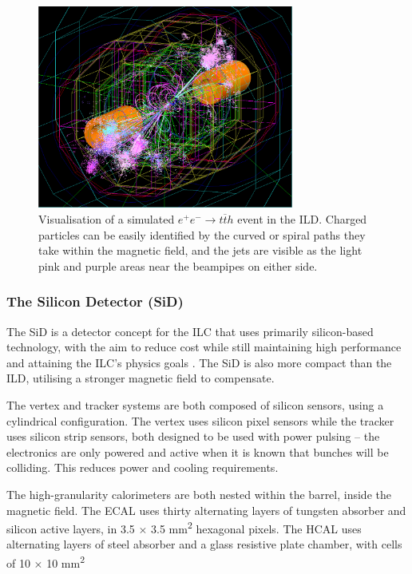 \begin{figure}[h]
	\centering
	\includegraphics[width=0.75\textwidth]{../Pictures/SimulatedEvent1.png}
	\caption{Visualisation of a simulated $e^+ e^- \rightarrow t \overline{t} h$ event in the \acrshort{ILD}. Charged particles can be easily identified by the curved or spiral paths they take within the magnetic field, and the jets are visible as the light pink and purple areas near the beampipes on either side.}
	\label{figure:colliders/ILD/tth-simulation}
\end{figure}

\subsubsection{The Silicon Detector (SiD)}
The \acrfull{SiD} is a detector concept for the \acrshort{ILC} that uses primarily silicon-based technology, with the aim to reduce cost while still maintaining high performance and attaining the \acrshort{ILC}'s physics goals \cite{ilc-tdr-detectors}. The \acrshort{SiD} is also more compact than the \acrshort{ILD}, utilising a stronger magnetic field to compensate.

The vertex and tracker systems are both composed of silicon sensors, using a cylindrical configuration. The vertex uses silicon pixel sensors while the tracker uses silicon strip sensors, both designed to be used with power pulsing -- the electronics are only powered and active when it is known that bunches will be colliding. This reduces power and cooling requirements. 

The high-granularity calorimeters are both nested within the barrel, inside the magnetic field. The \acrshort{ECAL} uses thirty alternating layers of tungsten absorber and silicon active layers, in 3.5 $\times$ 3.5 mm\textsuperscript{2} hexagonal pixels. The \acrshort{HCAL} uses alternating layers of steel absorber and a glass resistive plate chamber, with cells of 10 $\times$ 10 mm\textsuperscript{2}

